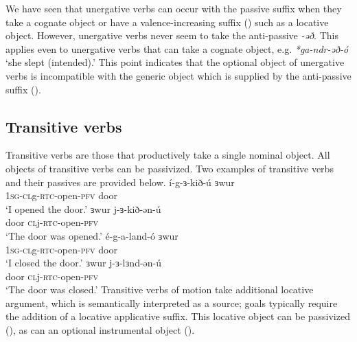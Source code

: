 We have seen that unergative verbs can occur with the passive suffix when they take a cognate object or have a valence-increasing suffix () such as a locative object. However, unergative verbs never seem to take the anti-passive \textit{-əð}. This applies even to unergative verbs that can take a cognate object, e.g. \textit{*ga-ndr-əð-ó} `she slept (intended).' This point indicates that the optional object of unergative verbs is incompatible with the generic object which is supplied by the anti-passive suffix (). %

%



%
%
%
%
%
%
 




\subsection{Transitive verbs}

Transitive verbs are those that productively take a single nominal object. All objects of transitive verbs can be passivized. Two examples of transitive verbs and their passives are provided below.
\ea 
	\ea \gll í-g-ɜ-kið-ú ɜwur \\
		\textsc{1sg-cl}g-\textsc{rtc-}open-\textsc{pfv} door\\
		\glt ‘I opened the door.’
	\ex \gll ɜwur j-ɜ-kið-ən-ú \\
		door \textsc{cl}j-\textsc{rtc-}open-\textsc{pfv}\\
		\glt ‘The door was opened.’
	\z
\ex \ea \gll é-g-a-land-ó ɜwur \\
		\textsc{1sg-cl}g-\textsc{rtc-}open-\textsc{pfv} door\\
		\glt ‘I closed the door.’
	\ex \gll ɜwur j-ɜ-lɜnd-ən-ú	\\
		door \textsc{cl}j-\textsc{rtc-}open-\textsc{pfv}\\
		\glt ‘The door was closed.’
	\z 
\z 
Transitive verbs of motion take additional locative argument, which is semantically interpreted as a source; goals typically require the addition of a locative applicative suffix. This locative object can be passivized (), as can an optional instrumental object (). 

